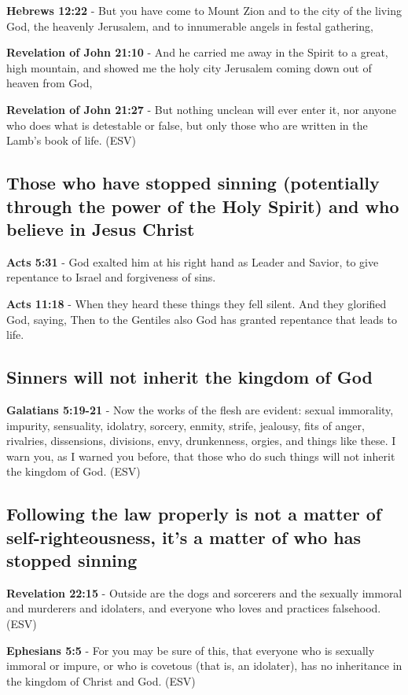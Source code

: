 \documentclass[11pt]{article}
\begin{document}
\textbf{Hebrews 12:22} - But you have come to Mount Zion and to the city of the living God, the heavenly Jerusalem, and to innumerable angels in festal gathering,

\textbf{Revelation of John 21:10} - And he carried me away in the Spirit to a great, high mountain, and showed me the holy city Jerusalem coming down out of heaven from God,

\textbf{Revelation of John 21:27} -  But nothing unclean will ever enter it, nor anyone who does what is detestable or false, but only those who are written in the Lamb's book of life. (ESV)

\subsection{Those who have stopped sinning (potentially through the power of the Holy Spirit) and who believe in Jesus Christ}
\label{sec:org3acdbec}
\textbf{Acts 5:31} - God exalted him at his right hand as Leader and Savior, to give repentance to Israel and forgiveness of sins.

\textbf{Acts 11:18} - When they heard these things they fell silent. And they glorified God, saying, Then to the Gentiles also God has granted repentance that leads to life.

\subsection{Sinners will not inherit the kingdom of God}
\label{sec:orgb359d52}
\textbf{Galatians 5:19-21} -  Now the works of the flesh are evident: sexual immorality, impurity, sensuality, idolatry, sorcery, enmity, strife, jealousy, fits of anger, rivalries, dissensions, divisions, envy, drunkenness, orgies, and things like these.  I warn you, as I warned you before, that those who do such things will not inherit the kingdom of God. (ESV)

\subsection{Following the law properly is not a matter of self-righteousness, it's a matter of who has stopped sinning}
\label{sec:org49cc73b}
\textbf{Revelation 22:15} -  Outside are the dogs and sorcerers and the sexually immoral and murderers and idolaters, and everyone who loves and practices falsehood.  (ESV)

\textbf{Ephesians 5:5} -  For you may be sure of this, that everyone who is sexually immoral or impure, or who is covetous (that is, an idolater), has no inheritance in the kingdom of Christ and God.  (ESV)
\end{document}
